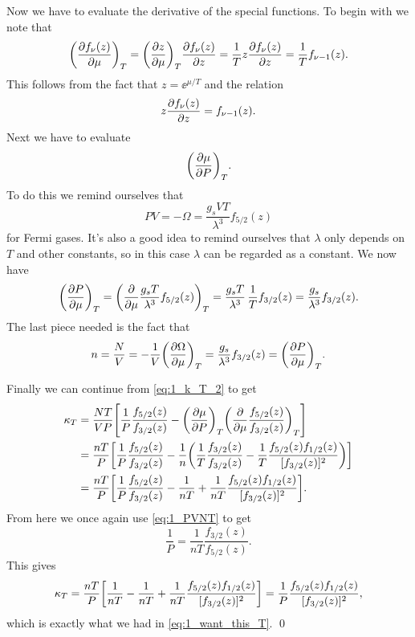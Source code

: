 \documentclass[11pt,letter, swedish, english
]{article}
\begin{document}
Now we have to evaluate the derivative of the special functions. To
begin with we note that
\begin{equation}
\qty(\pdv{f_\nu(z)}{\mu})_T=\qty(\pdv{z}{\mu})_T\pdv{f_\nu(z)}{z}
= \frac{1}{T}z\pdv{f_\nu(z)}{z}=\frac{1}{T}f_{\nu-1}(z).
\end{equation}
This follows from the fact that $z=\ee^{\mu/T}$ and the relation
\begin{equation}
z\pdv{f_\nu(z)}{z} = f_{\nu-1}(z).
\end{equation}
Next we have to evaluate
\begin{equation}
\qty(\pdv{\mu}{P})_T.
\end{equation}
To do this we remind ourselves that
\begin{equation}
PV=-\Omega=\frac{g_sVT}{\lambda^3}f_{5/2}(z)
\end{equation}
for Fermi gases. It's also a good idea to remind ourselves that
$\lambda$ only depends on $T$ and other constants, so in this case
$\lambda$ can be regarded as a constant. We now have
\begin{equation}
\qty(\pdv{P}{\mu})_T 
=\qty(\pdv{\mu} \frac{g_sT}{\lambda^3}f_{5/2}(z))_T 
=\frac{g_sT}{\lambda^3} \,\frac{1}{T}f_{3/2}(z) 
=\frac{g_s}{\lambda^3} f_{3/2}(z).
\end{equation}
The last piece needed is the fact that
\begin{equation}
n=\frac{N}{V}=-\frac{1}{V}\qty(\pdv{\Omega}{\mu})_T
=\frac{g_s}{\lambda^3} f_{3/2}(z)=\qty(\pdv{P}{\mu})_T.
\end{equation}

Finally we can continue from \eqref{eq:1_k_T_2} to get
\begin{equation}
\begin{aligned}
\kappa_T &= \frac{NT}{VP} \qty[
\frac{1}{P}\frac{f_{5/2}(z)}{f_{3/2}(z)}
-\qty(\pdv{\mu}{P})_T\qty(\pdv{\mu}\frac{f_{5/2}(z)}{f_{3/2}(z)})_T
]\\
&= \frac{nT}{P} \qty[
\frac{1}{P}\frac{f_{5/2}(z)}{f_{3/2}(z)}
-\frac{1}{n}\qty(\frac{1}{T}\frac{f_{3/2}(z)}{f_{3/2}(z)}
-\frac{1}{T}\frac{f_{5/2}(z)f_{1/2}(z)}{[f_{3/2}(z)]^2}
)]\\
&= \frac{nT}{P} \qty[
\frac{1}{P}\frac{f_{5/2}(z)}{f_{3/2}(z)}
-\frac{1}{nT}
+\frac{1}{nT}\frac{f_{5/2}(z)f_{1/2}(z)}{[f_{3/2}(z)]^2}
].
\end{aligned}
\end{equation}
From here we once again use \eqref{eq:1_PVNT} to get
\begin{equation}
\frac{1}{P}=\frac{1}{nT}\frac{f_{3/2}(z)}{f_{5/2}(z)}.
\end{equation}
This gives
\begin{equation}
\kappa_T = \frac{nT}{P} \qty[
\frac{1}{nT}
-\frac{1}{nT}
+\frac{1}{nT}\frac{f_{5/2}(z)f_{1/2}(z)}{[f_{3/2}(z)]^2}
]
=\frac{1}{P}\frac{f_{5/2}(z)f_{1/2}(z)}{[f_{3/2}(z)]^2},
\end{equation}
which is exactly what we had in \eqref{eq:1_want_this_T}.
\qed
\end{document}

